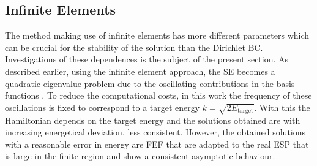 \subsection{Infinite Elements}
\label{sec:iBCbench}
The method making use of infinite elements has more different parameters which can be crucial for the stability of the solution than the Dirichlet BC.
Investigations of these dependences is the subject of the present section.
As described earlier, using the infinite element approach, the SE becomes a quadratic eigenvalue problem due to the oscillating contributions in the basis functions .
To reduce the computational costs, in this work the frequency of these oscillations is fixed to correspond to a target energy $k=\sqrt{2E_\text{target}}$.
With this the Hamiltonian depends on the target energy and the solutions obtained are with increasing energetical deviation, less consistent.
However, the obtained solutions with a reasonable error in energy are FEF that are adapted to the real ESP that is large in the finite region and show a consistent asymptotic behaviour.

